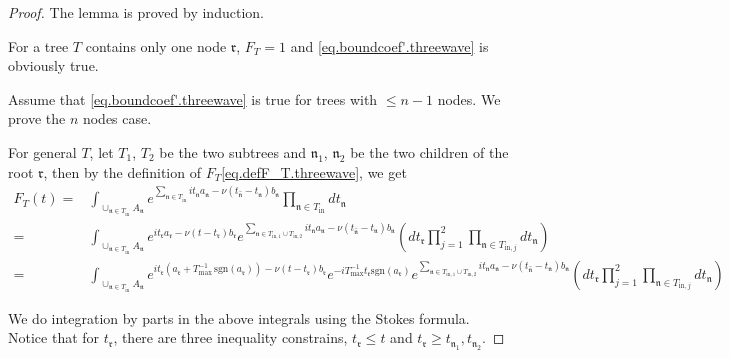 \begin{proof} The lemma is proved by induction.

For a tree $T$ contains only one node $\mathfrak{r}$, $F_{T}=1$ and \eqref{eq.boundcoef'.threewave} is obviously true.

Assume that \eqref{eq.boundcoef'.threewave} is true for trees with $\le n-1$ nodes. We prove the $n$ nodes case. 

For general $T$, let $T_1$, $T_2$ be the two subtrees and $\mathfrak{n}_1$, $\mathfrak{n}_2$ be the two children of the root $\mathfrak{r}$, then by the definition of $F_T$\eqref{eq.defF_T.threewave}, we get
\begin{equation}\label{eq.lemboundcoef'1.threewave}
\begin{split}
    F_{T}(t)=&\int_{\cup_{\mathfrak{n}\in T_{\text{in}}} A_{\mathfrak{n}}} e^{\sum_{\mathfrak{n}\in T_{\text{in}}}it_{\mathfrak{n}} a_{\mathfrak{n}} - \nu(t_{\widehat{\mathfrak{n}}}-t_{\mathfrak{n}})b_{\mathfrak{n}}} \prod_{\mathfrak{n}\in T_{\text{in}}} dt_{\mathfrak{n}}    
    \\
    =&\int_{\cup_{\mathfrak{n}\in T_{\text{in}}} A_{\mathfrak{n}}}e^{it_{\mathfrak{r}} a_{\mathfrak{r}} - \nu(t-t_{\mathfrak{r}})b_{\mathfrak{r}}} e^{\sum_{\mathfrak{n}\in T_{\text{in},1}\cup T_{\text{in},2}} it_{\mathfrak{n}} a_{\mathfrak{n}} - \nu(t_{\widehat{\mathfrak{n}}}-t_{\mathfrak{n}})b_{\mathfrak{n}}}  \left(dt_{\mathfrak{r}}\prod_{j=1}^2\prod_{\mathfrak{n}\in T_{\text{in},j}}dt_{\mathfrak{n}}  \right)
    \\
    =&\int_{\cup_{\mathfrak{n}\in T_{\text{in}}} A_{\mathfrak{n}}}e^{it_{\mathfrak{r}}(a_{\mathfrak{r}}+T^{-1}_{\text{max}}\, \text{sgn}(a_{\mathfrak{r}}))- \nu(t-t_{\mathfrak{r}})b_{\mathfrak{r}}} e^{-iT^{-1}_{\text{max}}t_{\mathfrak{r}} \text{sgn}(a_{\mathfrak{r}})} e^{\sum_{\mathfrak{n}\in T_{\text{in},1}\cup T_{\text{in},2}} it_{\mathfrak{n}} a_{\mathfrak{n}} - \nu(t_{\widehat{\mathfrak{n}}}-t_{\mathfrak{n}})b_{\mathfrak{n}}}  \left(dt_{\mathfrak{r}}\prod_{j=1}^2\prod_{\mathfrak{n}\in T_{\text{in},j}}dt_{\mathfrak{n}}  \right)
\end{split}
\end{equation}



We do integration by parts in the above integrals using the Stokes formula. Notice that for $t_{\mathfrak{r}}$, there are three inequality constrains, $t_{\mathfrak{r}}\le t$ and $t_{\mathfrak{r}}\ge t_{\mathfrak{n}_1},t_{\mathfrak{n}_2}$. 



\end{proof}
